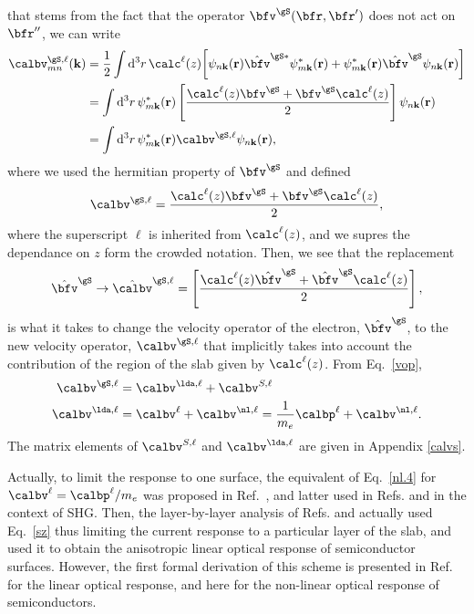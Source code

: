 \documentclass[floatfix,prb,aps,superscriptaddress,11pt,preprint,letterpaper]{revtex4}
\begin{document}
that stems from the fact that the operator $\bfv^\gS(\bfr,\bfr')$ does not act on
$\bfr''$, we can write
\begin{align}\label{nl.3}
\calbv^{\gS,\ell}_{mn}({\mathbf k})
&=
\frac{1}{2}
\int \mathrm{d}^3 r\,
 \calc^\ell(z)
 \bigg[
\psi_{n\mathbf{k}}(\mathbf{r})
\hat\bfv^{\gS *}\psi^*_{m\mathbf{k}}(\mathbf{r})
+ 
\psi^*_{m\mathbf{k}}(\mathbf{r})\hat\bfv^\gS
\psi_{n\mathbf{k}}(\mathbf{r})
\bigg]
\nonumber\\
&=
\int \mathrm{d}^3 r\,
\psi^*_{m\mathbf{k}}(\mathbf{r})
\left[\frac{\calc^\ell(z) \bfv^\gS +
\bfv^\gS \calc^\ell(z)}{2}\right]
\psi_{n\mathbf{k}}(\mathbf{r})
\nonumber\\
&=
\int \mathrm{d}^3 r\,
\psi^*_{m\mathbf{k}}(\mathbf{r})
\calbv^{\gS,\ell}
\psi_{n\mathbf{k}}(\mathbf{r})
,
\end{align}
where we used the hermitian property of $\bfv^\gS$ and  defined
\begin{align}\label{nl.4}
\calbv^{\gS,\ell}
=
\frac{\calc^\ell(z) \bfv^\gS +
\bfv^\gS \calc^\ell(z)}{2}
,
\end{align} 
where the superscript $\ell$ is inherited from $\calc^\ell(z)$, and we
supres the dependance on $z$ form the crowded notation.  
Then,
we see that the replacement
\begin{align}\label{vcali}
\hat\bfv^\gS \to \hat\calbv^{\gS,\ell}=\left[\frac{\calc^\ell(z) \hat\bfv^\gS +
\hat\bfv^\gS \calc^\ell(z)}{2}\right]
,
\end{align} 
is what it takes to change the
velocity operator of the electron, $\hat\bfv^\gS$, to the new velocity
operator, $\calbv^{\gS,\ell}$
 that implicitly takes into account the
contribution of the region of the slab given by $\calc^\ell(z)$.
From Eq.~\eqref{vop},
\begin{align}\label{vopii}
\calbv^{\gS,\ell}
&=
\calbv^{\lda,\ell}
+
\calbv^{S,\ell}
\nonumber\\
\calbv^{\lda,\ell}
&=
\calbv^{\ell}
+
\calbv^{\nl,\ell}
=
\frac{1}{m_e}
\calbp^{\ell}
+
\calbv^{\nl,\ell}
.
\end{align}
The matrix elements of $\calbv^{S,\ell}$ and $\calbv^{\lda,\ell}$
are given in 
Appendix \ref{calvs}.

Actually, 
to limit the response to one surface, 
the equivalent of Eq.~\eqref{nl.4} for $\calbv^\ell=\calbp^\ell/m_e$
 was proposed 
in Ref.~, and latter used in Refs.
and  in the context of SHG. Then, 
the layer-by-layer analysis of Refs.  
and 
actually used Eq.~\eqref{sz}
thus limiting the current response
to a particular layer of the slab, and used it to obtain the
anisotropic linear optical response of semiconductor surfaces.
However, the first formal derivation of this scheme is presented in
Ref.~ for the linear optical response, and
here for the non-linear optical response of semiconductors.
\end{document}
